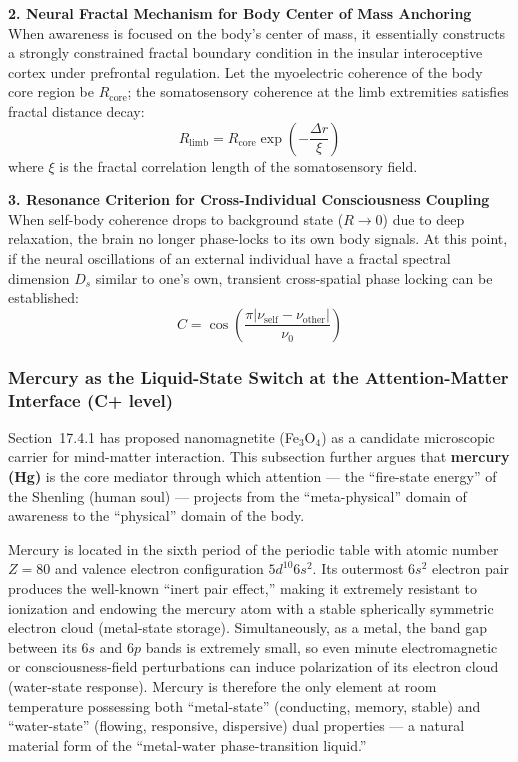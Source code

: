 \documentclass[12pt,a4paper,twocolumn]{article}
\begin{document}
\textbf{2. Neural Fractal Mechanism for Body Center of Mass Anchoring}
When awareness is focused on the body's center of mass, it essentially constructs a strongly constrained fractal boundary condition in the insular interoceptive cortex under prefrontal regulation. Let the myoelectric coherence of the body core region be $R_{\text{core}}$; the somatosensory coherence at the limb extremities satisfies fractal distance decay:
\[
R_{\text{limb}} = R_{\text{core}} \exp\left(-\frac{\Delta r}{\xi}\right)
\]
where $\xi$ is the fractal correlation length of the somatosensory field.

\textbf{3. Resonance Criterion for Cross-Individual Consciousness Coupling}
When self-body coherence drops to background state ($R\to0$) due to deep relaxation, the brain no longer phase-locks to its own body signals. At this point, if the neural oscillations of an external individual have a fractal spectral dimension $D_s$ similar to one's own, transient cross-spatial phase locking can be established:
\[
C = \cos\left( \frac{\pi |\nu_{\text{self}}-\nu_{\text{other}}|}{\nu_0} \right)
\]

\subsubsection{Mercury as the Liquid-State Switch at the Attention-Matter Interface (C+ level)}
\label{sec:mercury_interface}

Section~17.4.1 has proposed nanomagnetite (Fe$_3$O$_4$) as a candidate microscopic carrier for mind-matter interaction. This subsection further argues that \textbf{mercury (Hg)} is the core mediator through which attention --- the ``fire-state energy'' of the Shenling (human soul) --- projects from the ``meta-physical'' domain of awareness to the ``physical'' domain of the body.

Mercury is located in the sixth period of the periodic table with atomic number $Z=80$ and valence electron configuration $5d^{10}6s^2$. Its outermost $6s^2$ electron pair produces the well-known ``inert pair effect,'' making it extremely resistant to ionization and endowing the mercury atom with a stable spherically symmetric electron cloud (metal-state storage). Simultaneously, as a metal, the band gap between its $6s$ and $6p$ bands is extremely small, so even minute electromagnetic or consciousness-field perturbations can induce polarization of its electron cloud (water-state response). Mercury is therefore the only element at room temperature possessing both ``metal-state'' (conducting, memory, stable) and ``water-state'' (flowing, responsive, dispersive) dual properties --- a natural material form of the ``metal-water phase-transition liquid.''
\end{document}
